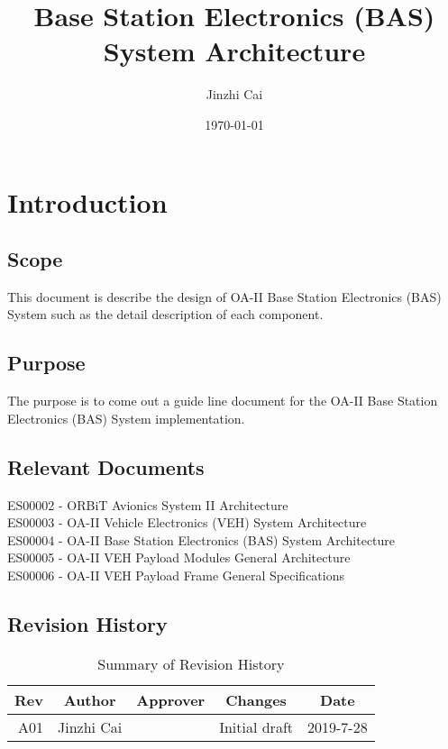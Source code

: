\documentclass[12pt,article]{memoir}
\title{Base Station Electronics (BAS) System Architecture}
\author{Jinzhi Cai}
\date{\today}
\begin{document}
	


\tableofcontents*
\clearpage


\chapter{Introduction}
\section{Scope}
This document is describe the design of OA-II Base Station Electronics (BAS) System such as the detail description of each component. 
\section{Purpose}
The purpose is to come out a guide line document for the OA-II Base Station Electronics (BAS) System implementation.
\section{Relevant Documents}
ES00002 - ORBiT Avionics System II Architecture\\
ES00003 - OA-II Vehicle Electronics (VEH) System Architecture\\
ES00004 - OA-II Base Station Electronics (BAS) System Architecture\\
ES00005 - OA-II VEH Payload Modules General Architecture\\
ES00006 - OA-II VEH Payload Frame General Specifications\\
\section{Revision History}
\begin{table}[H]
	\centering
	\begin{tabu}{r || c | c | c | c }
		Rev & Author     & Approver & Changes       & Date      \\ \hline
		A01 & Jinzhi Cai &          & Initial draft & 2019-7-28 \\
	\end{tabu}
	\caption{Summary of Revision History}
	\label{tab:rev}
\end{table}
\newpage
\end{document}
